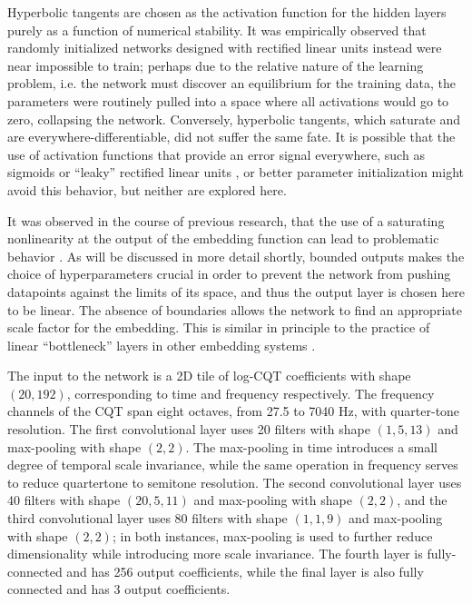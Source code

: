Hyperbolic tangents are chosen as the activation function for the hidden layers purely as a function of numerical stability.
It was empirically observed that randomly initialized networks designed with rectified linear units instead were near impossible to train; perhaps due to the relative nature of the learning problem, i.e. the network must discover an equilibrium for the training data, the parameters were routinely pulled into a space where all activations would go to zero, collapsing the network.
Conversely, hyperbolic tangents, which saturate and are everywhere-differentiable, did not suffer the same fate.
It is possible that the use of activation functions that provide an error signal everywhere, such as sigmoids or ``leaky'' rectified linear units \cite{Maas2014}, or better parameter initialization might avoid this behavior, but neither are explored here.

It was observed in the course of previous research, that the use of a saturating nonlinearity at the output of the embedding function can lead to problematic behavior \cite{Humphrey2011}.
As will be discussed in more detail shortly, bounded outputs makes the choice of hyperparameters crucial in order to prevent the network from pushing datapoints against the limits of its space, and thus the output layer is chosen here to be linear.
The absence of boundaries allows the network to find an appropriate scale factor for the embedding.
This is similar in principle to the practice of linear ``bottleneck'' layers  in other embedding systems \cite{Liao2013}.

The input to the network is a 2D tile of log-CQT coefficients with shape $(20, 192)$, corresponding to time and frequency respectively.
The frequency channels of the CQT span eight octaves, from 27.5 to 7040 Hz, with quarter-tone resolution.
The first convolutional layer uses 20 filters with shape $(1, 5, 13)$ and max-pooling with shape $(2, 2)$.
The max-pooling in time introduces a small degree of temporal scale invariance, while the same operation in frequency serves to reduce quartertone to semitone resolution.
The second convolutional layer uses 40 filters with shape $(20, 5, 11)$ and max-pooling with shape $(2, 2)$, and the third convolutional layer uses 80 filters with shape $(1, 1, 9)$ and max-pooling with shape $(2, 2)$;
in both instances, max-pooling is used to further reduce dimensionality while introducing more scale invariance.
The fourth layer is fully-connected and has 256 output coefficients, while the final layer is also fully connected and has 3 output coefficients.


